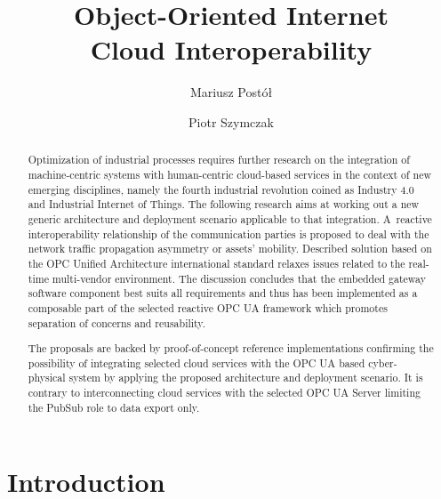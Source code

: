 \documentclass[runningheads]{llncs}
\begin{document}
\title{Object-Oriented Internet\\ Cloud Interoperability}

\author{Mariusz Postół  \and Piotr Szymczak }

\maketitle

\begin{abstract}

      Optimization of industrial processes requires further research on the integration of machine-centric systems with human-centric cloud-based services in the context of new emerging disciplines, namely the fourth industrial revolution coined as Industry 4.0 and Industrial Internet of Things. The following research aims at working out a new generic architecture and deployment scenario applicable to that integration. A~reactive interoperability relationship of the communication parties is proposed to deal with the network traffic propagation asymmetry or assets’ mobility. Described solution based on the OPC Unified Architecture international standard relaxes issues related to the real-time multi-vendor environment. The discussion  concludes that the embedded gateway software component best suits all requirements and thus has been implemented as a composable part of the selected reactive OPC UA framework which promotes separation of concerns and reusability.
      
      The proposals are backed by proof-of-concept reference implementations confirming the possibility of integrating selected cloud services with the OPC UA based cyber-physical system by applying the proposed architecture and deployment scenario. It is contrary to interconnecting cloud services with the selected OPC UA Server limiting the PubSub role to data export only.


\end{abstract}

\section{Introduction}\label{introduction}
\end{document}
